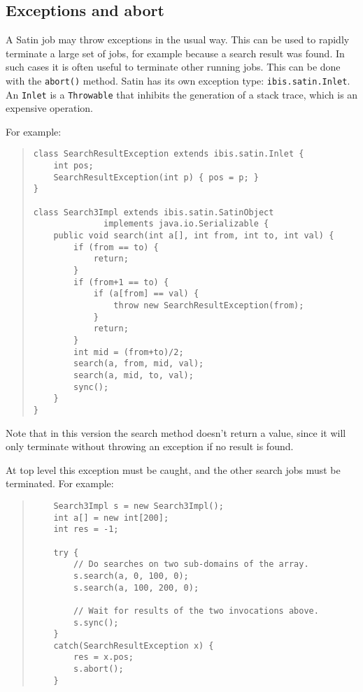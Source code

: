 \documentclass[10pt]{article}
\newcommand{\mysubsection}[1]{\subsection{#1}\label{#1}}
\begin{document}
\mysubsection{Exceptions and abort}

A Satin job may throw exceptions in the usual way. This can be used
to rapidly terminate a large set of jobs, for example because a search
result was found. In such cases it is often useful to terminate other
running jobs.  This can be done with the \texttt{abort()} method.  Satin has
its own exception type: \texttt{ibis.satin.Inlet}.  An \texttt{Inlet} is a
\texttt{Throwable} that inhibits the generation of a stack trace, which
is an expensive operation.

For example:

\begin{quote}
\begin{verbatim}
class SearchResultException extends ibis.satin.Inlet {
    int pos;
    SearchResultException(int p) { pos = p; }
}

class Search3Impl extends ibis.satin.SatinObject
              implements java.io.Serializable {
    public void search(int a[], int from, int to, int val) {
        if (from == to) {
            return;
        }
        if (from+1 == to) {
            if (a[from] == val) {
                throw new SearchResultException(from);
            }
            return;
        }
        int mid = (from+to)/2;
        search(a, from, mid, val);
        search(a, mid, to, val);
        sync();
    }
}
\end{verbatim}
\end{quote}

\noindent
Note that in this version the search method doesn't return a value,
since it will only terminate without throwing an exception if no
result is found.

At top level this exception must be caught, and the other search
jobs must be terminated. For example:

\begin{quote}
\begin{verbatim}
    Search3Impl s = new Search3Impl();
    int a[] = new int[200];
    int res = -1;

    try {
        // Do searches on two sub-domains of the array.
        s.search(a, 0, 100, 0);
        s.search(a, 100, 200, 0);

        // Wait for results of the two invocations above.
        s.sync();
    }
    catch(SearchResultException x) {
        res = x.pos;
        s.abort();
    }
\end{verbatim}
\end{quote}
\end{document}
